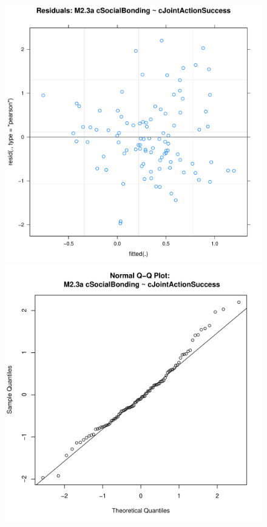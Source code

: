\begin{figure}[htbp]
        \includegraphics[scale =.4]{images/MLM23aScatter.pdf}
        \includegraphics[scale =.4]{images/MLM23aQQNorm.pdf}

\end{figure}
